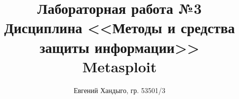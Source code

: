 \documentclass[12pt]{article}
\begin{document}
\title{
    Лабораторная работа №3 \\ 
    Дисциплина <<Методы и средства защиты информации>> \\ 
    Metasploit}
\author{Евгений Хандыго, гр. 53501/3}

\maketitle
\tableofcontents

\newpage









\end{document}
